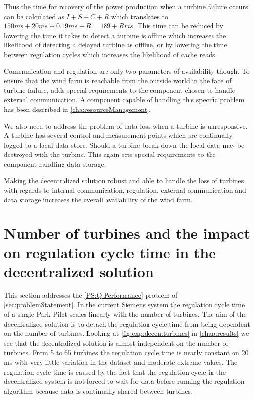 Thus the time for recovery of the power production when a turbine failure occurs can be calculated as $I + S + C + R$ which translates to $150 ms + 20 ms + 0.19 ms + R = 189 + R ms$. This time can be reduced by lowering the time it takes to detect a turbine is offline which increases the likelihood of detecting a delayed turbine as offline, or by lowering the time between regulation cycles which increases the likelihood of cache reads.

Communication and regulation are only two parameters of availability though. To ensure that the wind farm is reachable from the outside world in the face of turbine failure, adds special requirements to the component chosen to handle external communication. A component capable of handling this specific problem has been described in \cref{cha:resourceManagement}.

We also need to address the problem of data loss when a turbine is unresponsive. A turbine has several control and measurement points which are continually logged to a local data store. Should a turbine break down the local data may be destroyed with the turbine. This again sets special requirements to the component handling data storage. 

Making the decentralized solution robust and able to handle the loss of turbines with regards to internal communication, regulation, external communication and data storage increases the overall availability of the wind farm. 

\section{Number of turbines and the impact on regulation cycle time in the decentralized solution}
\label{sec:disc:turbinesVScycletime}
This section addresses the \ref{PS:Q:Performance} problem of \cref{sec:problemStatement}. In the current Siemens system the regulation cycle time of a single Park Pilot scales linearly with the number of turbines.
The aim of the decentralized solution is to detach the regulation cycle time from being dependent on the number of turbines. 
Looking at \cref{fig:exp:decen:turbines} in \cref{chap:results} we see that the decentralized solution is almost independent on the number of turbines.
From 5 to 65 turbines the regulation cycle time is nearly constant on 20 ms with very little variation in the dataset and moderate extreme values.
The regulation cycle time is caused by the fact that the regulation cycle in the decentralized system is not forced to wait for data before running the regulation algorithm because data is continually shared between turbines.

